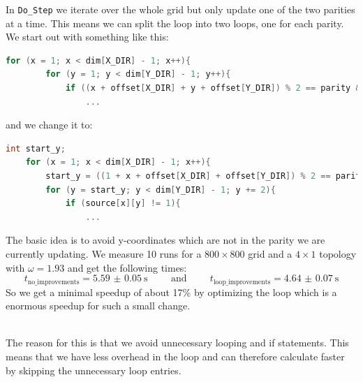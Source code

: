 In \texttt{Do\_Step} we iterate over the whole grid but only update one of the two parities at a time. This means we can split the loop into two loops, one for each parity. We start out with something like this:
\begin{lstlisting}[language=c]
    for (x = 1; x < dim[X_DIR] - 1; x++){
        for (y = 1; y < dim[Y_DIR] - 1; y++){
            if ((x + offset[X_DIR] + y + offset[Y_DIR]) % 2 == parity && source[x][y] != 1){
                ...
\end{lstlisting}
and we change it to:
\begin{lstlisting}[language=c]
    int start_y;
    for (x = 1; x < dim[X_DIR] - 1; x++){
        start_y = ((1 + x + offset[X_DIR] + offset[Y_DIR]) % 2 == parity) ? 1 : 2;
        for (y = start_y; y < dim[Y_DIR] - 1; y += 2){
            if (source[x][y] != 1){
                ...
\end{lstlisting}
The basic idea is to avoid y-coordinates which are not in the parity we are currently updating. 
We measure 10 runs for a $800 \times 800$ grid and a $4 \times 1$ topology with $\omega = 1.93$ and get the following times: 
\[t_{\text{no\_improvements}} = \SI{5.59(5)}{\second}\hspace{1cm}\text{and}\hspace{1cm}t_{\text{loop\_improvements}} = \SI{4.64(7)}{\second}\]
So we get a minimal speedup of about 17\% by optimizing the loop which is a enormous speedup for such a small change.

\\
The reason for this is that we avoid unnecessary looping and if statements. This means that we have less overhead in the loop and can therefore calculate faster by skipping the unnecessary loop entries. 

